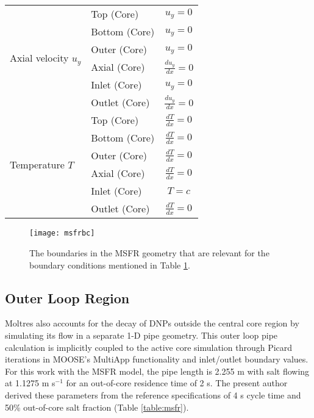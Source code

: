 \begin{table}[htbp!]
\begin{tabular}{ l l c}
        \midrule
        \multirow{6}{*}{Axial velocity $u_y$} & Top (Core) & $u_y = 0$ \\
        & Bottom (Core) & $u_y = 0$ \\
        & Outer (Core) & $u_y = 0$ \\
        & Axial (Core) & $\frac{d u_y}{dx} = 0$ \\[.5ex]
        & Inlet (Core) & $u_y = 0$ \\
        & Outlet (Core) & $\frac{d u_y}{dx} = 0$ \\[.5ex]
        \midrule
        \multirow{6}{*}{Temperature $T$} & Top (Core) &
        $\frac{d T}{dx} = 0$ \\[.5ex]
        & Bottom (Core) & $\frac{d T}{dx} = 0$ \\[.5ex]
        & Outer (Core) & $\frac{d T}{dx} = 0$ \\[.5ex]
        & Axial (Core) & $\frac{d T}{dx} = 0$ \\[.5ex]
        & Inlet (Core) & $T = c$ \\
        & Outlet (Core) & $\frac{d T}{dx} = 0$ \\[.5ex]
		\bottomrule
	\end{tabular}
	\label{table:corebc}
\end{table}

\clearpage

\begin{figure}[htb!]
    \centering
    \texttt{[image: msfrbc]}
    \caption{The boundaries in the \gls{MSFR} geometry that are relevant for
    the boundary conditions mentioned in Table \ref{table:corebc}.}
    \label{fig:msfrbc}
\end{figure}

\subsection{Outer Loop Region}

Moltres also accounts for the decay of
\glspl{DNP} outside the central core region by simulating its flow in a
separate 1-D pipe geometry. This outer loop pipe calculation is implicitly
coupled to the active core simulation through Picard iterations in MOOSE's
MultiApp functionality and inlet/outlet boundary values. For this work with
the \gls{MSFR} model, the pipe length is 2.255 m with salt flowing at 1.1275 m
s$^{-1}$ for an out-of-core residence time of 2 s. The present author derived
these parameters from the reference specifications of 4 s cycle
time and 50\% out-of-core salt fraction (Table \ref{table:msfr}).

